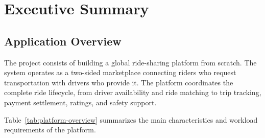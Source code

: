 \section{Executive Summary}


\subsection{Application Overview}

The project consists of building a global ride-sharing platform from scratch. The system operates as a two-sided marketplace connecting riders who request transportation with drivers who provide it. The platform coordinates the complete ride lifecycle, from driver availability and ride matching to trip tracking, payment settlement, ratings, and safety support.

Table~\ref{tab:platform-overview} summarizes the main characteristics and workload requirements of the platform.

